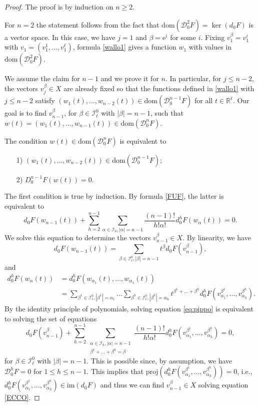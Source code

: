 \documentclass[12pt, reqno]{amsart}
\theoremstyle{plain}
\theoremstyle{definition}
\theoremstyle{remark}
\numberwithin{equation}{section}
\newcommand{\R}{\mathbb{R}}
\newcommand{\eee}{\mathrm{e}}
\newcommand{\0}{\theta}
\renewcommand{\a}{\alpha}
\renewcommand{\b}{\beta}
\newcommand{\1}{{-1}}
\renewcommand{\l}{\ell}
\renewcommand{\=}{\coloneqq}
\renewcommand{\.}{\dots}
\newcommand{\mc}{\mathcal}
\newcommand{\proj}{\mathrm{proj}}
\newcommand{\dom}{\mathrm{dom}}
\newcommand{\be}{\begin{equation}}
\newcommand{\ee}{\end{equation}}
\begin{document}
\begin{proof}
        The proof is by induction on $n\geq2$.

        For $n=2$ the statement  follows from the fact that $\dom(\mc D_0^2F)=\ker(d_0F)$ is a vector space.
        In this case, we   have $j=1$ and $\beta=\eee^ i$ for some $i$. Fixing  $v_1^\b = v_1^i$ with  $v_1=(v_1^1,\ldots, v_1^\l)$,
          formula \eqref{wallo1}        gives a function $w_1$ with values in $\dom(\mc D_0^2F)$.




        We assume the claim  for $n-1$ and we   prove it for $n$.  In particular, for $j\leq n-2$,
        the vectors $v_j^\b\in X$ are already fixed so that the functions defined in
        \eqref{wallo1} with $j\leq n-2$ satisfy
        $(w_1(t),\.,w_{n-2}(t))\in\dom(\mc D_0^{n-1}F)$ for all $t\in\R^\l$.
        Our goal is to   find $v_{n-1}^\b$, for $\b\in \mathscr I_\l^0$ with $|\b|=n-1$, such that  $w(t)=(w_1(t),\.,w_{n-1}(t))\in\dom(\mc D_0^{n}F)$.


        The condition $w(t)\in\dom(\mc D_0^{n}F)$ is equivalent to
        \begin{itemize}
         \item[1)] $(w_1(t),\.,w_{n-2}(t))\in\dom(\mc D_0^{n-1}F)$;
         \item[2)] $D_0^{n-1}F(w(t))=0$.
        \end{itemize}
        The first condition is true by induction. By formula \eqref{FUF}, the latter
        is equivalent to
        \be\label{eq:pippo}
                d_0F(w_{n-1}(t))+\sum_{h=2}^{n-1}\sum_{\alpha\in \mathscr I_h,|\alpha|=n-1}\frac{(n-1)!}{h!\alpha!}d_0^hF(w_\alpha(t))=0.
        \ee
        We  solve this equation to determine the vectors $v_{n-1}^\b\in X $. By linearity, we have
        \[
         d_0F(w_{n-1}(t))=\sum_{\b\in \mathscr I_\l^0,|\b|=n-1}t^\b d_0F(v_{n-1}^\b),
        \]
        and
        \begin{align*}
         d_0^hF(w_\a(t))&=d_0^hF(w_{\a_1}(t),\.,w_{\a_1}(t))\\
         &=\sum_{\b^1\in \mathscr I_\l^0,|\b^1|=\a_1}\.\sum_{\b^h\in \mathscr I_\l^0,|\b^h|=\a_h} t^{\b^1+\.+\b^h}d_0^hF(v_{\a_1}^{\b^1},\.,v_{\a_h}^{\b^h}).
        \end{align*}
        By  the identity principle of  polynomials, solving equation \eqref{eq:pippo} is equivalent to  solving the set of equations
        \begin{equation}\label{ECCO}
         d_0F(v_{n-1}^\b)+\sum_{h=2}^{n-1}\sum_{\substack{\alpha\in \mathscr I_h,|\alpha|=n-1\\ \b^1+\.+\b^h=\b}}\frac{(n-1)!}{h!\alpha!}d_0^hF(v_{\a_1}^{\b^1},\.,v_{\a_h}^{\b^h})=0,
        \end{equation}
        for $\b\in\mc I_\l^0$ with $|\b|=n-1$. This is possible since, by assumption, we have  $\mc D_0^h F = 0$ for $1\le h\le n-1$. This implies that $\proj(d_0^hF(v_{\a_1}^{\b^1},\.,v_{\a_h}^{\b^h}))=0$, i.e.,  $d_0^hF(v_{\a_1}^{\b^1},\.,v_{\a_h}^{\b^h})\in \mathrm{im}(d_0F)$ and thus we can find
        $v_{n-1}^\b\in X$ solving   equation \eqref{ECCO}.
\end{proof}
\end{document}
